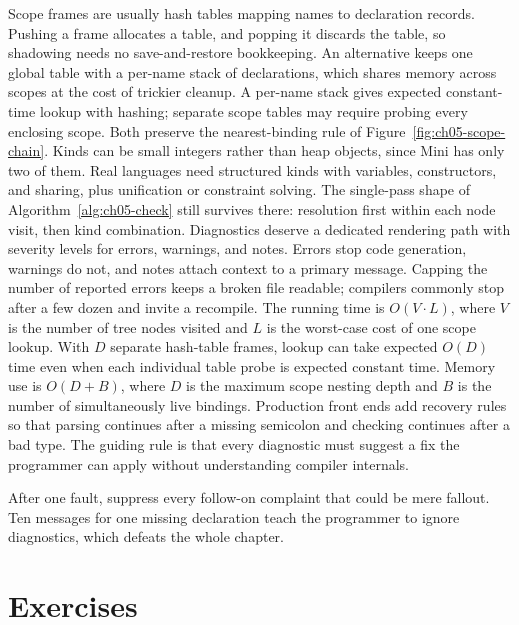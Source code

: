 Scope frames are usually hash tables mapping names to declaration records.
Pushing a frame allocates a table, and popping it discards the table, so shadowing needs no save-and-restore bookkeeping.
An alternative keeps one global table with a per-name stack of declarations, which shares memory across scopes at the cost of trickier cleanup.
A per-name stack gives expected constant-time lookup with hashing; separate scope tables may require probing every enclosing scope.
Both preserve the nearest-binding rule of Figure~\ref{fig:ch05-scope-chain}.
Kinds can be small integers rather than heap objects, since Mini has only two of them.
Real languages need structured kinds with variables, constructors, and sharing, plus unification or constraint solving.
The single-pass shape of Algorithm~\ref{alg:ch05-check} still survives there: resolution first within each node visit, then kind combination.
Diagnostics deserve a dedicated rendering path with severity levels for errors, warnings, and notes.
Errors stop code generation, warnings do not, and notes attach context to a primary message.
Capping the number of reported errors keeps a broken file readable; compilers commonly stop after a few dozen and invite a recompile.
The running time is $O(V \cdot L)$, where $V$ is the number of tree nodes visited and $L$ is the worst-case cost of one scope lookup.
With $D$ separate hash-table frames, lookup can take expected $O(D)$ time even when each individual table probe is expected constant time.
Memory use is $O(D + B)$, where $D$ is the maximum scope nesting depth and $B$ is the number of simultaneously live bindings.
Production front ends add recovery rules so that parsing continues after a missing semicolon and checking continues after a bad type.
The guiding rule is that every diagnostic must suggest a fix the programmer can apply without understanding compiler internals.
\begin{ccwarning}[No cascades]
After one fault, suppress every follow-on complaint that could be mere fallout.
Ten messages for one missing declaration teach the programmer to ignore diagnostics, which defeats the whole chapter.
\end{ccwarning}

\section{Exercises}
\label{sec:ch05-exercises}

